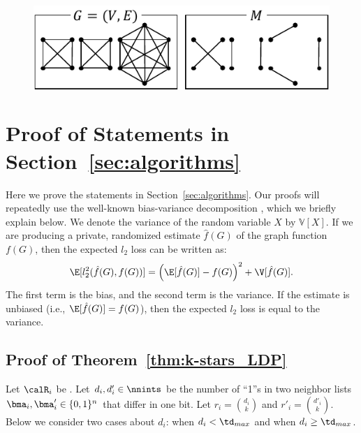 
\begin{figure}[t]
  \centering
  \includegraphics[width=0.88\linewidth]{fig/IndCube_triangle.pdf}
  \caption{
  }\label{fig:mono-cube_triangle}
\end{figure}


\section{Proof of Statements in Section~\ref{sec:algorithms}}
\label{sec:proof}
Here we prove the statements in Section~\ref{sec:algorithms}. 
Our proofs will repeatedly use the well-known bias-variance decomposition \cite{mlpp}, which we briefly explain below. 
We denote the variance of the random variable $X$ by $\mathbb{V}[X]$. 
If we are producing a private, randomized estimate $\hat{f}(G)$ of the graph function $f(G)$, then the expected $l_2$ loss can be written as: 
\begin{equation}\label{eq:bias-var}
  \E[l_2^2(\hat{f}(G),f(G))] = \left(\E[\hat{f}(G)] - f(G)\right)^2
  + \V[\hat{f}(G)].
\end{equation}
The first term is the bias, and the second term is the variance. 
If the estimate is unbiased (i.e., $\E[\hat{f}(G)] = f(G)$), then the expected $l_2$ loss is equal to the variance.

\subsection{Proof of Theorem~\ref{thm:k-stars_LDP}}
Let $\calR_i$ be . 
Let $d_i,d'_i \in \nnints$ be the number of ``1''s in two neighbor lists $\bma_i,\bma'_i \in \{0,1\}^n$ that differ in one bit. 
Let $r_i = \binom{d_i}{k}$ and $r'_i = \binom{d'_i}{k}$. 
Below we consider two cases about $d_i$: when $d_i < \td_{max}$ and when $d_i \geq \td_{max}$.

